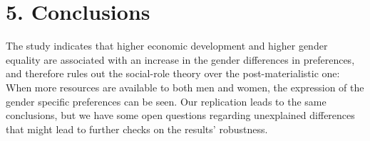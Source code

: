 \documentclass[
  11pt,
]{article}
\begin{document}
\hypertarget{conclusions}{%
\section{5. Conclusions}\label{conclusions}}

The study indicates that higher economic development and higher gender
equality are associated with an increase in the gender differences in
preferences, and therefore rules out the social-role theory over the
post-materialistic one: When more resources are available to both men
and women, the expression of the gender specific preferences can be
seen. Our replication leads to the same conclusions, but we have some
open questions regarding unexplained differences that might lead to
further checks on the results' robustness.

\printbibliography[title=References]
\end{document}
